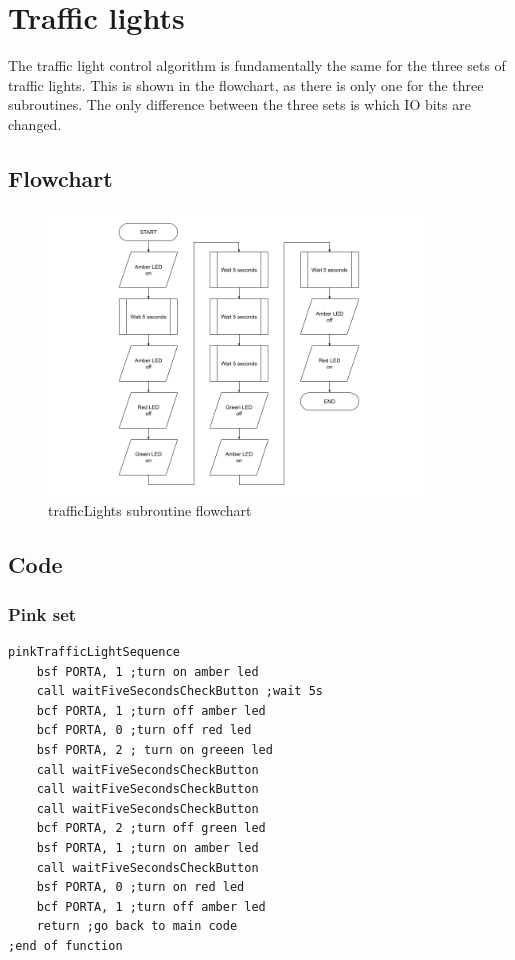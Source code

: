 \section{Traffic lights}
The traffic light control algorithm is fundamentally the same for the three sets of traffic lights. This is shown in the flowchart, as there is only one for the three subroutines. The only difference between the three sets is which IO bits are changed.
\subsection*{Flowchart}
\begin{figure}[H]
    \centering
    \includegraphics[width=0.9\textwidth]{images/flowchart-trafficLights.png}
    \caption{trafficLights subroutine flowchart}
    \label{fig:flowchart-trafficLights}
\end{figure}

\subsection*{Code}
\subsubsection*{Pink set}
\begin{lstlisting}[language={[x86masm]Assembler}, style=assembly, caption=Pink Traffic Light sequence]
pinkTrafficLightSequence
	bsf PORTA, 1 ;turn on amber led
	call waitFiveSecondsCheckButton ;wait 5s
	bcf PORTA, 1 ;turn off amber led
	bcf PORTA, 0 ;turn off red led
	bsf PORTA, 2 ; turn on greeen led
	call waitFiveSecondsCheckButton
	call waitFiveSecondsCheckButton
	call waitFiveSecondsCheckButton
	bcf PORTA, 2 ;turn off green led
	bsf PORTA, 1 ;turn on amber led
	call waitFiveSecondsCheckButton
	bsf PORTA, 0 ;turn on red led
	bcf PORTA, 1 ;turn off amber led
	return ;go back to main code
;end of function
\end{lstlisting}
